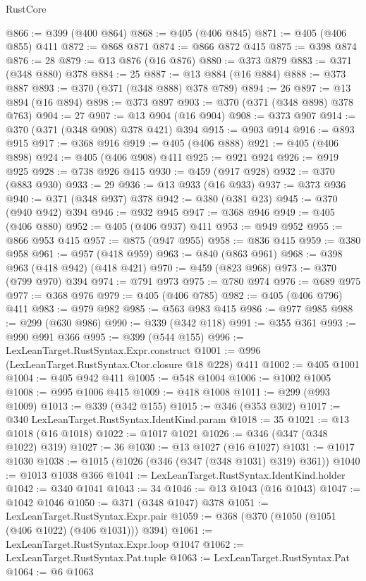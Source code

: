 \begin{lexlean}{RustCore}
\begin{coremodule}
@866 := @399 (@400 @864)
@868 := @405 (@406 @845)
@871 := @405 (@406 @855) @411
@872 := @868 @871
@874 := @866 @872 @415
@875 := @398 @874
@876 := 28
@879 := @13 @876 (@16 @876)
@880 := @373 @879
@883 := @371 (@348 @880) @378
@884 := 25
@887 := @13 @884 (@16 @884)
@888 := @373 @887
@893 := @370 (@371 (@348 @888) @378 @789)
@894 := 26
@897 := @13 @894 (@16 @894)
@898 := @373 @897
@903 := @370 (@371 (@348 @898) @378 @763)
@904 := 27
@907 := @13 @904 (@16 @904)
@908 := @373 @907
@914 := @370 (@371 (@348 @908) @378 @421) @394
@915 := @903 @914
@916 := @893 @915
@917 := @368 @916
@919 := @405 (@406 @888)
@921 := @405 (@406 @898)
@924 := @405 (@406 @908) @411
@925 := @921 @924
@926 := @919 @925
@928 := @738 @926 @415
@930 := @459 (@917 @928)
@932 := @370 (@883 @930)
@933 := 29
@936 := @13 @933 (@16 @933)
@937 := @373 @936
@940 := @371 (@348 @937) @378
@942 := @380 (@381 @23)
@945 := @370 (@940 @942) @394
@946 := @932 @945
@947 := @368 @946
@949 := @405 (@406 @880)
@952 := @405 (@406 @937) @411
@953 := @949 @952
@955 := @866 @953 @415
@957 := @875 (@947 @955)
@958 := @836 @415
@959 := @380 @958
@961 := @957 (@418 @959)
@963 := @840 (@863 @961)
@968 := @398 @963 (@418 @942) (@418 @421)
@970 := @459 (@823 @968)
@973 := @370 (@799 @970) @394
@974 := @791 @973
@975 := @780 @974
@976 := @689 @975
@977 := @368 @976
@979 := @405 (@406 @785)
@982 := @405 (@406 @796) @411
@983 := @979 @982
@985 := @563 @983 @415
@986 := @977 @985
@988 := @299 (@630 @986)
@990 := @339 (@342 @118)
@991 := @355 @361
@993 := @990 @991 @366
@995 := @399 (@544 @155)
@996 := LexLeanTarget.RustSyntax.Expr.construct
@1001 := @996 (LexLeanTarget.RustSyntax.Ctor.closure @18 @228) @411
@1002 := @405 @1001
@1004 := @405 @942 @411
@1005 := @548 @1004
@1006 := @1002 @1005
@1008 := @995 @1006 @415
@1009 := @418 @1008
@1011 := @299 (@993 @1009)
@1013 := @339 (@342 @155)
@1015 := @346 (@353 @302)
@1017 := @340 LexLeanTarget.RustSyntax.IdentKind.param
@1018 := 35
@1021 := @13 @1018 (@16 @1018)
@1022 := @1017 @1021
@1026 := @346 (@347 (@348 @1022) @319)
@1027 := 36
@1030 := @13 @1027 (@16 @1027)
@1031 := @1017 @1030
@1038 := @1015 (@1026 (@346 (@347 (@348 @1031) @319) @361))
@1040 := @1013 @1038 @366
@1041 := LexLeanTarget.RustSyntax.IdentKind.holder
@1042 := @340 @1041
@1043 := 34
@1046 := @13 @1043 (@16 @1043)
@1047 := @1042 @1046
@1050 := @371 (@348 @1047) @378
@1051 := LexLeanTarget.RustSyntax.Expr.pair
@1059 := @368 (@370 (@1050 (@1051 (@406 @1022) (@406 @1031))) @394)
@1061 := LexLeanTarget.RustSyntax.Expr.loop @1047
@1062 := LexLeanTarget.RustSyntax.Pat.tuple
@1063 := LexLeanTarget.RustSyntax.Pat
@1064 := @6 @1063

\end{coremodule}
\end{lexlean}
